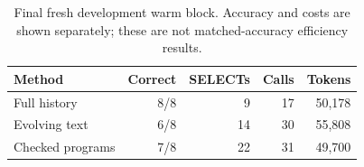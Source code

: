\begin{table}[t]\centering\small\setlength{\tabcolsep}{4pt}
\caption{Final fresh development warm block. Accuracy and costs are shown separately; these are not matched-accuracy efficiency results.}
\begin{tabular}{lrrrr}\toprule Method & Correct & SELECTs & Calls & Tokens \\ \midrule
Full history & 8/8 & 9 & 17 & 50,178 \\
Evolving text & 6/8 & 14 & 30 & 55,808 \\
Checked programs & 7/8 & 22 & 31 & 49,700 \\
\bottomrule\end{tabular}\end{table}
